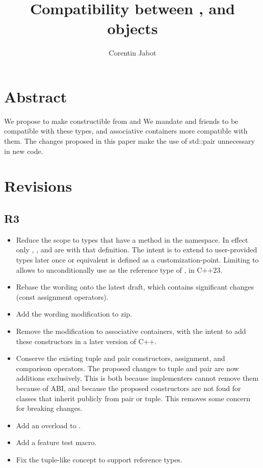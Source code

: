 \documentclass{wg21}
\title{Compatibility between \tcode{tuple}, \tcode{pair} and \placeholder{tuple-like} objects}
\author{Corentin Jabot}{corentin.jabot@gmail.com}
\begin{document}
\maketitle


\section{Abstract}

We propose to make  constructible from  and 
We mandate  and friends to be compatible with these types,
and associative containers more compatible with them.
The changes proposed in this paper make the use of std::pair unnecessary in new code.

\section{Revisions}

\subsection{R3}
\begin{itemize}
\item Reduce the scope to types that have a  method in the  namespace.
In effect only , ,  and  are 
with that definition.
The intent is to extend to user-provided types later once  or equivalent is defined as a customization-point.
Limiting to  allows to unconditionally use  as the reference type of ,  in C++23.
\item Rebase the wording onto the latest draft, which contains significant changes (const assignment operators).
\item Add the wording modification to zip.
\item Remove the modification to associative containers, with the intent to add these constructors in a later version of C++.
\item Conserve the existing tuple and pair constructors, assignment, and comparison operators. The proposed changes to tuple and pair are now additions exclusively. This is both because implementers cannot remove them because of ABI, and because the proposed constructors are not foud for classes that inherit publicly from pair or tuple. This removes some concern for breaking changes.
\item Add an overload to .
\item Add a feature test macro.
\item Fix the tuple-like concept to support reference types.
\end{itemize}
\end{document}
